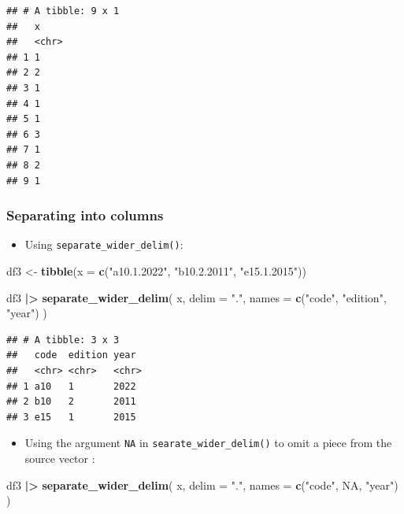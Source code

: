 \documentclass[
]{article}
\newenvironment{Shaded}{\begin{snugshade}}{\end{snugshade}}
\newcommand{\AttributeTok}[1]{\textcolor[rgb]{0.13,0.29,0.53}{#1}}
\newcommand{\ConstantTok}[1]{\textcolor[rgb]{0.56,0.35,0.01}{#1}}
\newcommand{\FunctionTok}[1]{\textcolor[rgb]{0.13,0.29,0.53}{\textbf{#1}}}
\newcommand{\NormalTok}[1]{#1}
\newcommand{\OtherTok}[1]{\textcolor[rgb]{0.56,0.35,0.01}{#1}}
\newcommand{\SpecialCharTok}[1]{\textcolor[rgb]{0.81,0.36,0.00}{\textbf{#1}}}
\newcommand{\StringTok}[1]{\textcolor[rgb]{0.31,0.60,0.02}{#1}}
\providecommand{\tightlist}{%
  \setlength{\itemsep}{0pt}\setlength{\parskip}{0pt}}
\begin{document}
\begin{verbatim}
## # A tibble: 9 x 1
##   x    
##   <chr>
## 1 1    
## 2 2    
## 3 1    
## 4 1    
## 5 1    
## 6 3    
## 7 1    
## 8 2    
## 9 1
\end{verbatim}

\subsubsection{Separating into columns}\label{separating-into-columns}

\begin{itemize}
\tightlist
\item
  Using \texttt{separate\_wider\_delim()}:
\end{itemize}

\begin{Shaded}
\begin{Highlighting}[]
\NormalTok{df3 }\OtherTok{\textless{}{-}} \FunctionTok{tibble}\NormalTok{(}\AttributeTok{x =} \FunctionTok{c}\NormalTok{(}\StringTok{"a10.1.2022"}\NormalTok{, }\StringTok{"b10.2.2011"}\NormalTok{, }\StringTok{"e15.1.2015"}\NormalTok{))}

\NormalTok{df3 }\SpecialCharTok{|\textgreater{}} 
  \FunctionTok{separate\_wider\_delim}\NormalTok{(}
\NormalTok{    x, }\AttributeTok{delim =} \StringTok{"."}\NormalTok{,}
    \AttributeTok{names =} \FunctionTok{c}\NormalTok{(}\StringTok{"code"}\NormalTok{, }\StringTok{"edition"}\NormalTok{, }\StringTok{"year"}\NormalTok{)}
\NormalTok{  )}
\end{Highlighting}
\end{Shaded}

\begin{verbatim}
## # A tibble: 3 x 3
##   code  edition year 
##   <chr> <chr>   <chr>
## 1 a10   1       2022 
## 2 b10   2       2011 
## 3 e15   1       2015
\end{verbatim}

\begin{itemize}
\tightlist
\item
  Using the argument \texttt{NA} in \texttt{searate\_wider\_delim()} to
  omit a piece from the source vector :
\end{itemize}

\begin{Shaded}
\begin{Highlighting}[]
\NormalTok{df3 }\SpecialCharTok{|\textgreater{}} 
  \FunctionTok{separate\_wider\_delim}\NormalTok{(}
\NormalTok{    x, }
    \AttributeTok{delim =} \StringTok{"."}\NormalTok{,}
    \AttributeTok{names =} \FunctionTok{c}\NormalTok{(}\StringTok{"code"}\NormalTok{, }\ConstantTok{NA}\NormalTok{, }\StringTok{"year"}\NormalTok{)}
\NormalTok{  )}
\end{Highlighting}
\end{Shaded}
\end{document}
